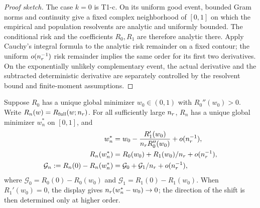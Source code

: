 \begin{proof}[Proof sketch]
The case $k=0$ is T1-c. On its uniform good event, bounded Gram norms and continuity give a fixed complex neighborhood of $[0,1]$ on which the empirical and population resolvents are analytic and uniformly bounded. The conditional risk and the coefficients $R_0,R_1$ are therefore analytic there. Apply Cauchy's integral formula to the analytic risk remainder on a fixed contour; the uniform $o(n_r^{-1})$ risk remainder implies the same order for its first two derivatives. On the exponentially unlikely complementary event, the actual derivative and the subtracted deterministic derivative are separately controlled by the resolvent bound and finite-moment assumptions.
\end{proof}

\begin{theorem}\label{supp:thm:optfull}
Suppose $R_0$ has a unique global minimizer $w_0\in(0,1)$ with $R_0''(w_0)>0$. Write $R_n(w)=R_{\mathrm{full}}(w;n_r)$. For all sufficiently large $n_r$, $R_n$ has a unique global minimizer $w_n^*$ on $[0,1]$, and
\begin{align}
 w_n^*&=w_0-\frac{R_1'(w_0)}{n_r R_0''(w_0)}+o(n_r^{-1}),\notag\\
 R_n(w_n^*)&=R_0(w_0)+R_1(w_0)/n_r+o(n_r^{-1}),\\
 \mathcal G_n:=R_n(0)-R_n(w_n^*)&=\mathcal G_0+\mathcal G_1/n_r+o(n_r^{-1}),\notag
\end{align}
where $\mathcal G_0=R_0(0)-R_0(w_0)$ and $\mathcal G_1=R_1(0)-R_1(w_0)$. When $R_1'(w_0)=0$, the display gives $n_r(w_n^*-w_0)\to0$; the direction of the shift is then determined only at higher order.
\end{theorem}

